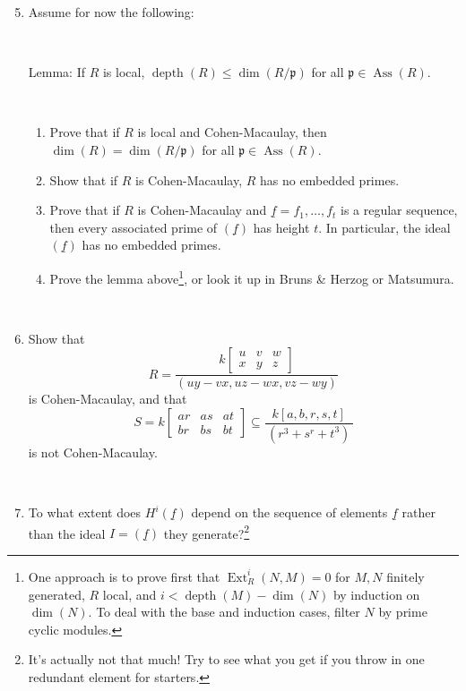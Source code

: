\documentclass[11pt]{book}
\numberwithin{equation}{section}
\numberwithin{theorem}{chapter}
\theoremstyle{definition}
\newtheorem*{basic properties}{Basic Properties}
\newtheorem*{Important Remark}{Important Remark}
\theoremstyle{remark}
\newcommand{\p}{\mathfrak{p}}
\newcommand{\Ext}{\operatorname{Ext}}
\newcommand{\Ass}{\operatorname{Ass}}
\renewcommand{\dim}{\operatorname{dim}}
\newcommand{\depth}{\operatorname{depth}}
\begin{document}
\begin{enumerate}\setcounter{enumi}{4}		
	
	
	
	
	\item Assume for now the following:
	
	\
	
	{\sc Lemma:} If $R$ is local, $\depth(R) \leq \dim(R/\p)$ for all $\p\in \Ass(R)$.
	
	\
	
	\begin{enumerate}
		\item Prove that if $R$ is local and Cohen-Macaulay, then $\dim(R)=\dim(R/\p)$ for all $\p\in \Ass(R)$.
		\item Show that if $R$ is Cohen-Macaulay, $R$ has no embedded primes.
		\item Prove that if $R$ is Cohen-Macaulay and $\underline{f} = f_1, \ldots, f_t$ is a regular sequence, then every associated prime of $(\underline{f})$ has height $t$. In particular, the ideal $(\underline{f})$ has no embedded primes.
		\item Prove the lemma above\footnote{One approach is to prove first that $\Ext^i_R(N,M)=0$ for $M,N$ finitely generated, $R$ local, and $i<\depth(M)-\dim(N)$ by induction on $\dim(N)$. To deal with the base and induction cases, filter $N$ by prime cyclic modules.}, or look it up in Bruns \& Herzog or Matsumura.
	\end{enumerate}
	
	\
	
	\item Show that 
	$$R = \frac{k\begin{bmatrix} u & v & w \\ x & y & z\end{bmatrix}}{(uy-vx,uz-wx,vz-wy)}$$ is Cohen-Macaulay, and that
	$$S = k\begin{bmatrix} ar & as & at \\ br & bs & bt \end{bmatrix} \subseteq \displaystyle\frac{ k[a,b,r,s,t] }{\, (r^3+s^r+t^3) \,}$$
	is not Cohen-Macaulay.
	
	\
	
	\item To what extent does $H^i(\underline{f})$ depend on the sequence of elements $\underline{f}$ rather than the ideal $I=(\underline{f})$ they generate?\footnote{It's actually not that much! Try to see what you get if you throw in one redundant element for starters.}
\end{enumerate}
\end{document}
